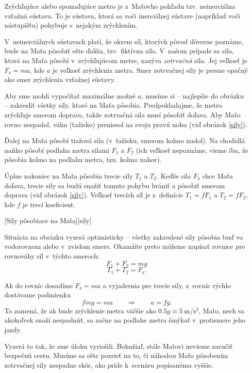 Zrýchľujúce alebo spomaľujúce metro je z~Maťovho pohľadu tzv. neinerciálna vzťažná sústava.
To je sústava, ktorá sa voči inerciálnej sústave (napríklad voči nástupišťu) pohybuje s~nejakým zrýchlením.

V~neinerciálnych sústavach platí, že okrem síl, ktorých pôvod dôverne poznáme,
bude na Maťa pôsobiť ešte ďalšia, tzv. fiktívna sila. V~našom prípade sa sila, ktorá
na Maťa pôsobí v~zrýchľujúcom metre, nazýva \emph{zotrvačná} sila. Jej veľkosť
je $F_{\mathrm{z}} = ma$, kde $a$ je veľkosť zrýchlenia metra. Smer zotrvačnej sily je
presne opačný ako smer zrýchlenia vzťažnej sústavy.

Aby sme mohli vypočítať maximálne možné $a$, musíme si -- najlepšie do obrázku -- zakresliť
všetky sily, ktoré na Maťa pôsobia. Predpokladajme, že metro zrýchľuje smerom
doprava, takže zotrvačná sila musí pôsobiť doľava. Aby Maťo rovno nespadol,
váhu (ťažisko) preniesol na svoju pravú nohu (viď obrázok \ref{sily}).

Ďalej na Maťa pôsobí tiažová sila (v~ťažisku, smerom kolmo
nadol). Na chodidlá naňho pôsobí podlaha metra silami $F_1$ a $F_2$ (ich veľkosť
nepoznáme, vieme iba, že pôsobia kolmo na podlahu metra, tzn. kolmo nahor).

Úplne nakoniec na Maťa pôsobia trecie sily $T_1$ a $T_2$. Keďže sila $F_{\mathrm{z}}$ chce
Maťa  doľava, trecie sily sa budú snažiť tomuto pohybu brániť a pôsobiť
smerom doprava (viď obrázok \ref{sily}). Veľkosť trecích síl je
z~definície $T_1 = f F_1$ a $T_2 = f F_2$, kde $f$ je trecí koeficient.

[Sily pôsobiace na Maťa][sily]

Situácia na obrázku vyzerá optimisticky -- všetky zakreslené sily pôsobia
buď vo vodorovnom alebo v~zvislom smere. Okamžite preto môžeme napísať
rovnice pre rovnováhy síl v~týchto smeroch:
$$F_1 + F_2 = mg$$
$$T_1 + T_2 = F_{\mathrm{z}}\text{.}$$

Ak do rovníc dosadíme $F_{\mathrm{z}} = ma$ a vyjadrenia pre trecie sily, z~rovníc
rýchlo dostávame podmienku
$$
  f mg = ma \qquad\Rightarrow\qquad a = fg \text{.}
$$
To zamená, že ak bude zrýchlenie metra väčšie ako $ 0.5g \approx \SI{5}{\meter\per\second\squared}$, Maťo,
nech sa akokoľvek snaží nespadnúť, sa začne na podlahe metra šmýkať v~protismere
jeho jazdy.

Vyzerá to tak, že sme úlohu vyriešili. Bohužiaľ, stále Maťovi nevieme zaručiť
bezpečnú cestu. Musíme sa ešte pozrieť na to, či náhodou Maťo pôsobením
zotrvačnej sily nespadne skôr, ako príde k~scenáru popísanému vyššie.

